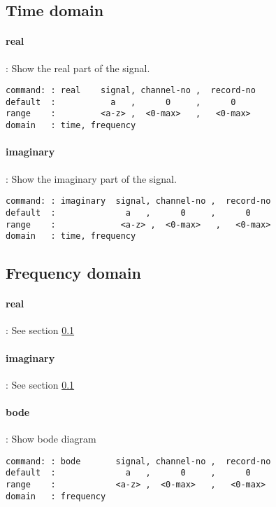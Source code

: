 \documentclass{report}
\newcommand{\bc}{\scriptsize}
\newcommand{\ec}{\normalsize}
\begin{document}
\subsection{Time domain}\label{sec:timedom}

\paragraph{real}: Show the real part of the signal.

\bc
\begin{verbatim}
command: : real    signal, channel-no ,  record-no
default  :           a   ,      0     ,      0
range    :         <a-z> ,  <0-max>   ,   <0-max>
domain   : time, frequency
\end{verbatim}
\ec


\paragraph{imaginary}: Show the imaginary part of the signal.

\bc
\begin{verbatim}
command: : imaginary  signal, channel-no ,  record-no
default  :              a   ,      0     ,      0
range    :             <a-z> ,  <0-max>   ,   <0-max>
domain   : time, frequency
\end{verbatim}
\ec

\subsection{Frequency domain}

\paragraph{real}: See section \ref{sec:timedom}

\paragraph{imaginary}: See section \ref{sec:timedom}

\paragraph{bode}: Show bode diagram

\bc
\begin{verbatim}
command: : bode       signal, channel-no ,  record-no
default  :              a   ,      0     ,      0
range    :            <a-z> ,  <0-max>   ,   <0-max>
domain   : frequency
\end{verbatim}
\ec
\end{document}
